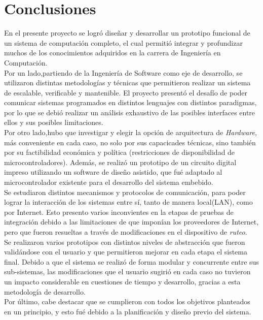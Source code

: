 
\chapter{Conclusiones} %

\label{Chapter7} %


En el presente proyecto se logró diseñar y desarrollar un prototipo funcional de un sistema de computación completo, el cual permitió integrar y profundizar muchos de los conocimientos adquiridos en la carrera de Ingeniería en Computación.\\
Por un lado,partiendo de la Ingeniería de Software como eje de desarrollo, se utilizaron distintas metodologías y técnicas que permitieron realizar un sistema de escalable, verificable y mantenible. El proyecto presentó el desafío de poder comunicar sistemas programados en distintos lenguajes con distintos paradigmas, por lo que se debió realizar un análisis exhaustivo de las posibles interfaces entre ellos y sus posibles limitaciones. \\
Por otro lado,hubo que investigar y elegir la opción de arquitectura de \textit{Hardware}, más conveniente en cada caso, no solo por sus capacicades técnicas, sino también por su factibilidad económica y política (restricciones de disponibilidad de microcontroladores). Además, se realizó un prototipo de un circuito digital impreso utilizando un software de diseño asistido, que fué adaptado al microcontrolador existente para el desarrollo del sistema embebido.\\
Se estudiaron distintos mecanismos y protocolos de comunicación, para poder lograr la interacción de los sistemas entre sí, tanto de manera local(LAN), como por Internet. Esto presento varios inconvientes en la etapas de pruebas de integración debido a las limitaciones de que imponían los proveedores de Internet, pero que fueron resueltas a través de modificaciones en el dispositivo de \textit{ruteo}.\\
Se realizaron varios prototipos con distintos niveles de abstracción que fueron validándose con el usuario y que permitieron mejorar en cada etapa el sistema final. Debido a que el sistema se realizó de forma modular y concurrente entre sus sub-sistemas, las modificaciones que el usuario sugirió en cada caso no tuvieron un impacto considerable en cuestiones de tiempo y desarrollo, gracias a esta metodología de desarrollo.\\
Por último, cabe destacar que se cumplieron con todos los objetivos planteados en un principio, y esto fué debido a la planificación y diseño previo del sistema. 



